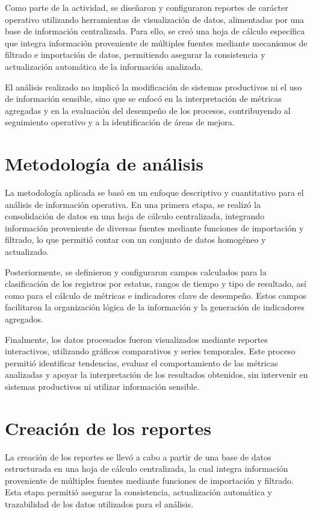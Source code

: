 \documentclass[12pt]{article}
\begin{document}
Como parte de la actividad, se diseñaron y configuraron reportes de carácter operativo utilizando herramientas de visualización de datos, alimentadas por una base de información centralizada. Para ello, se creó una hoja de cálculo específica que integra información proveniente de múltiples fuentes mediante mecanismos de filtrado e importación de datos, permitiendo asegurar la consistencia y actualización automática de la información analizada.

El análisis realizado no implicó la modificación de sistemas productivos ni el uso de información sensible, sino que se enfocó en la interpretación de métricas agregadas y en la evaluación del desempeño de los procesos, contribuyendo al seguimiento operativo y a la identificación de áreas de mejora.


\section*{Metodología de análisis}
La metodología aplicada se basó en un enfoque descriptivo y cuantitativo para el análisis de información operativa. En una primera etapa, se realizó la consolidación de datos en una hoja de cálculo centralizada, integrando información proveniente de diversas fuentes mediante funciones de importación y filtrado, lo que permitió contar con un conjunto de datos homogéneo y actualizado.

Posteriormente, se definieron y configuraron campos calculados para la clasificación de los registros por estatus, rangos de tiempo y tipo de resultado, así como para el cálculo de métricas e indicadores clave de desempeño. Estos campos facilitaron la organización lógica de la información y la generación de indicadores agregados.

Finalmente, los datos procesados fueron visualizados mediante reportes interactivos, utilizando gráficos comparativos y series temporales. Este proceso permitió identificar tendencias, evaluar el comportamiento de las métricas analizadas y apoyar la interpretación de los resultados obtenidos, sin intervenir en sistemas productivos ni utilizar información sensible.


\section*{Creación de los reportes}
La creación de los reportes se llevó a cabo a partir de una base de datos estructurada en una hoja de cálculo centralizada, la cual integra información proveniente de múltiples fuentes mediante funciones de importación y filtrado. Esta etapa permitió asegurar la consistencia, actualización automática y trazabilidad de los datos utilizados para el análisis.
\end{document}
